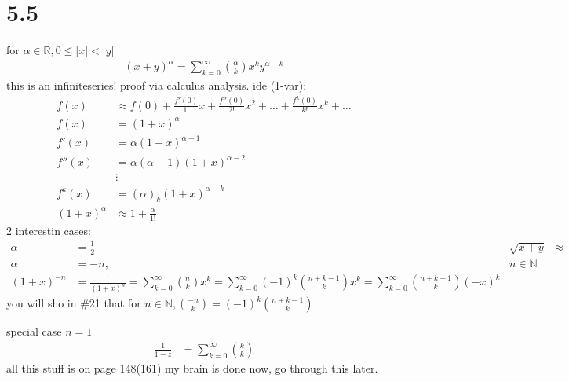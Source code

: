 \documentclass{article}
\begin{document}
\section*{5.5}
for $\alpha \in\mathbb{R}, 0\le\lvert x\rvert<\lvert y\rvert$
\begin{align*}
  (x+y)^{\alpha }=\sum\limits_{k=0}^\infty{\binom{\alpha}{k}x^ky^{\alpha -k}}
\end{align*}
this is an infiniteseries! proof via calculus analysis. ide (1-var):
\begin{align*}
  f(x)&\approx f(0)+\frac{f'(0)}{1!}x+\frac{f''(0)}{2!}x^2+\dots+\frac{f^k(0)}{k!}x^k+\dots\\
  f(x)&=(1+x)^\alpha \\
  f'(x)&=\alpha (1+x)^{\alpha-1}\\
  f''(x)&=\alpha(\alpha -1)(1+x)^{\alpha-2}\\
  &\vdots\\
  f^k(x)&=(\alpha)_k(1+x)^{\alpha-k}\\
  (1+x)^\alpha &\approx 1+\frac{\alpha }{1!}
\end{align*}
2 interestin cases:
\begin{align*}
  \alpha&=\frac{1}{2}&\sqrt{x+y}&\approx\\
  \alpha &=-n,&n\in\mathbb{N}\\
  (1+x)^{-n}&=\frac{1}{(1+x)^n}=\sum\limits_{k=0}^\infty{\binom{n}{k}x^k}=\sum\limits_{k=0}^\infty{(-1)^k\binom{n+k-1}{k}x^k}=\sum\limits_{k=0}^\infty{\binom{n+k-1}{k}(-x)^k}
\end{align*}
you will sho in \#21 that for $n\in\mathbb{N},\binom{-n}{k}=(-1)^k\binom{n+k-1}{k}$

special case $n=1$
\begin{align*}
  \frac{1}{1-z}&=\sum\limits_{k=0}^\infty{\binom{k}{k}}
\end{align*}
all this stuff is on page 148(161) my brain is done now, go through this later.
\end{document}
